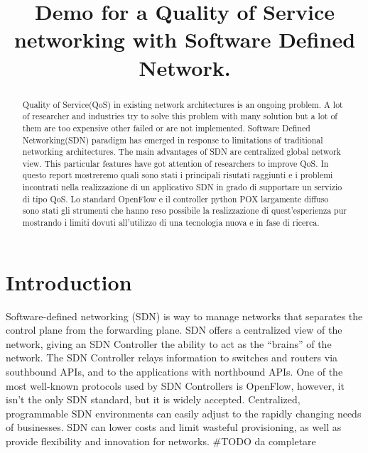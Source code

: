 \documentclass[conference,10pt]{IEEEtran}
\begin{document}
\title{Demo for a Quality of Service networking with Software Defined Network.}

\author{
}

\maketitle

\begin{abstract}
Quality of Service(QoS) in existing network architectures is an ongoing problem.
A lot of researcher and industries try to solve this problem with many solution but a lot of them are too
expensive other failed or are not implemented.
Software Defined Networking(SDN) paradigm has emerged in response to limitations of traditional networking architectures.
The main advantages of SDN are centralized global network view. This particular features have got attention of researchers to improve QoS.
In questo report mostreremo quali sono stati i principali risutati raggiunti e i problemi incontrati nella realizzazione di
un applicativo SDN in grado di supportare un servizio di tipo QoS.
Lo standard OpenFlow e il controller python POX largamente diffuso sono stati gli strumenti che hanno reso possibile la
realizzazione di quest'esperienza pur mostrando i limiti dovuti all'utilizzo di una tecnologia nuova e in fase di ricerca.
\end{abstract}

\section{Introduction}\label{sec:intro}
Software-defined networking (SDN) is way to manage networks that separates the control plane from the forwarding plane.
SDN offers a centralized view of the network, giving an SDN Controller the ability to act as the “brains” of the network.
The SDN Controller relays information to switches and routers via southbound APIs, and to the applications with northbound APIs.
One of the most well-known protocols used by SDN Controllers is OpenFlow, however, it isn’t the only SDN standard, but it is widely accepted.
Centralized, programmable SDN environments can easily adjust to the rapidly changing needs of businesses. SDN can lower costs and limit
wasteful provisioning, as well as provide flexibility and innovation for networks.
\#TODO da completare
\end{document}
